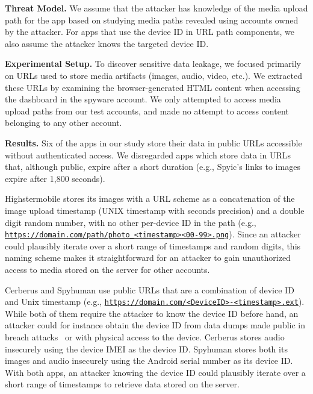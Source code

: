 \textbf{Threat Model.} We assume that the attacker has knowledge of
the media upload path for the app based on studying media paths
revealed using accounts owned by the attacker.  For apps that use the
device ID in URL path components, we also assume the attacker knows
the targeted device ID.

\textbf{Experimental Setup.} To discover sensitive data leakage, we
focused primarily on URLs used to store media artifacts (images,
audio, video, etc.).  We extracted these URLs by examining the
browser-generated HTML content when accessing the dashboard in the
spyware account.  We only attempted to access media upload paths from
our test accounts, and made no attempt to access content belonging to
any other account.


\textbf{Results.}  Six of the apps in our study store their data in
public URLs accessible without authenticated access.  We disregarded
apps which store data in URLs that, although public, expire after a
short duration (e.g., Spyic's links to images expire after 1,800
seconds).


Highstermobile stores its images with a URL scheme as a concatenation
of the image upload timestamp (UNIX timestamp with seconds precision)
and a double digit random number, with no other per-device ID in the
path (e.g.,
\texttt{\url{https://domain.com/path/photo_<timestamp><00-99>.png}}).
Since an attacker could plausibly iterate over a short range of
timestamps and random digits, this naming scheme makes it
straightforward for an attacker to gain unauthorized access to media
stored on the server for other accounts.

Cerberus and Spyhuman use public URLs that are a combination of device
ID and Unix timestamp
(e.g., \texttt{\url{https://domain.com/<DeviceID>-<timestamp>.ext}}).
While both of them require the attacker to know the device ID before
hand, an attacker could for instance obtain the device ID from data
dumps made public in breach attacks~\cite{mSpybrea38:online,
  Companyt8:online, HackerSt66:online, Cerberus12:online,
  Stalkerw59:online} or with physical access to the device.
Cerberus stores audio insecurely using the device IMEI as the device
ID.  Spyhuman stores both its images and audio insecurely using the
Android serial number as its device ID.  With both apps, an attacker
knowing the device ID could plausibly iterate over a short range of
timestamps to retrieve data stored on the server.


